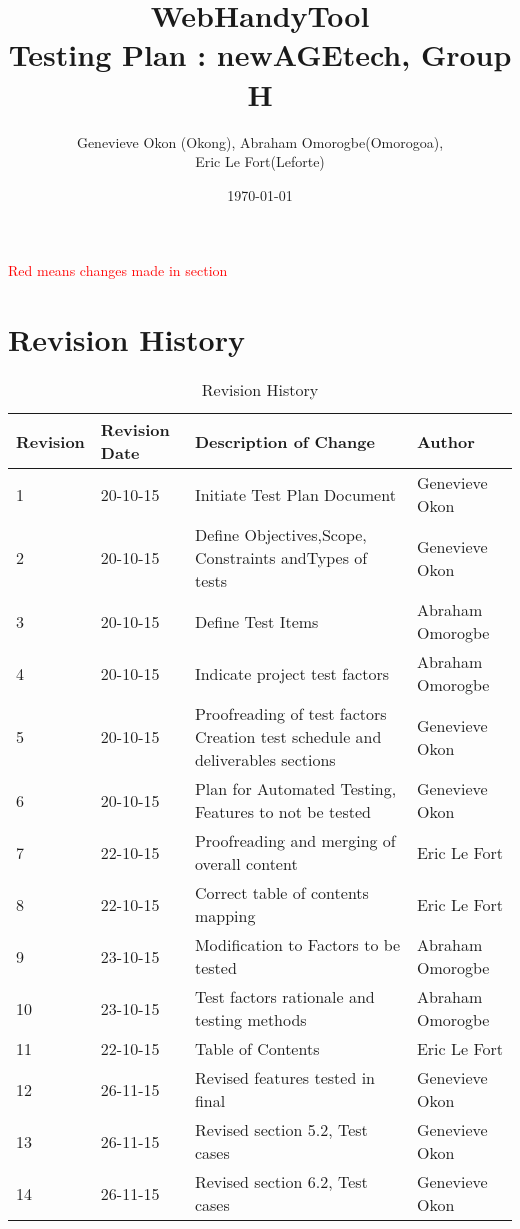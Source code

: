 \documentclass[12pt, titlepage]{article}
\begin{document}
\title{WebHandyTool \\
 Testing Plan : newAGEtech, Group H }
\author{Genevieve Okon (Okong), Abraham Omorogbe(Omorogoa),\\
 Eric Le Fort(Leforte)}
\date{\today}
\maketitle
\pagebreak


\tableofcontents

\pagebreak
\listoffigures
\listoftables
\pagebreak

\textcolor{red}{Red means changes made in section}
\section{Revision History}
\begin{table}[h!]
	\begin{tabular}{| p{5cm} | p{5cm} | p{5cm} |p{5cm} |}    \hline
Revision  &Revision Date &Description of Change &Author\\ \hline
1& 20-10-15& Initiate Test Plan Document&Genevieve Okon\\ \hline
2& 20-10-15& Define Objectives,Scope, Constraints andTypes of tests&Genevieve Okon\\ \hline
3& 20-10-15& Define Test Items&Abraham Omorogbe\\ \hline
4& 20-10-15& Indicate project test factors&Abraham Omorogbe\\ \hline
5& 20-10-15&Proofreading of test factors Creation test schedule and deliverables sections&Genevieve Okon\\ \hline
6& 20-10-15&Plan for Automated Testing, Features to not be tested&Genevieve Okon\\ \hline
7& 22-10-15& Proofreading and merging of overall content&Eric Le Fort\\ \hline
8& 22-10-15& Correct table of contents mapping&Eric Le Fort\\ \hline
9& 23-10-15& Modification to Factors to be tested&Abraham Omorogbe\\ \hline
10& 23-10-15& Test factors rationale and testing methods&Abraham Omorogbe\\ \hline
11& 22-10-15& Table of Contents&Eric Le Fort\\ \hline

12& 26-11-15& Revised features tested in final&Genevieve Okon\\ \hline
13& 26-11-15& Revised section 5.2, Test cases&Genevieve Okon\\ \hline
14& 26-11-15& Revised section 6.2, Test cases&Genevieve Okon\\ \hline
       \end{tabular}
       
       \caption{Revision History}
       \label{table:Revision History}
\end{table}
\end{document}
